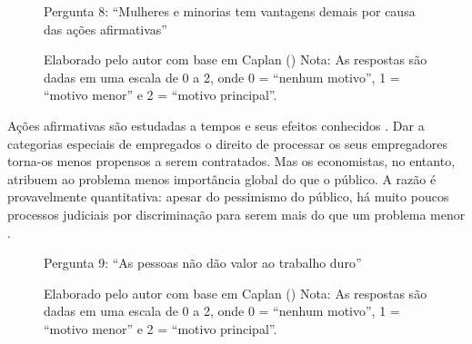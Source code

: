 \begin{figure}[H]
    \centering
    \caption*{Pergunta 8: “Mulheres e minorias tem vantagens demais por causa das ações afirmativas”}
    \caption{Elaborado pelo autor com base em Caplan (\citeyear{The_Myth_of_the_Rational_Voter}) \newline
    Nota: As respostas são dadas em uma escala de 0 a 2, onde 0 = “nenhum motivo”, 1 = “motivo menor” e 2 = “motivo principal”.}
    \label{fig:pergunta_8}
\end{figure}


Ações afirmativas são estudadas a tempos e seus efeitos conhecidos \cite{sowell2004affirmative}. Dar a categorias especiais de empregados o direito de processar os seus empregadores torna-os menos propensos a serem contratados. Mas os economistas, no entanto, atribuem ao problema menos importância global do que o público. A razão é provavelmente quantitativa: apesar do pessimismo do público, há muito poucos processos judiciais por discriminação para serem mais do que um problema menor \cite{The_Myth_of_the_Rational_Voter}.




\begin{figure}[H]
    \centering
    \caption*{Pergunta 9: “As pessoas não dão valor ao trabalho duro”}
    \caption{Elaborado pelo autor com base em Caplan (\citeyear{The_Myth_of_the_Rational_Voter}) \newline
    Nota: As respostas são dadas em uma escala de 0 a 2, onde 0 = “nenhum motivo”, 1 = “motivo menor” e 2 = “motivo principal”.}
    \label{fig:pergunta_9}
\end{figure}

